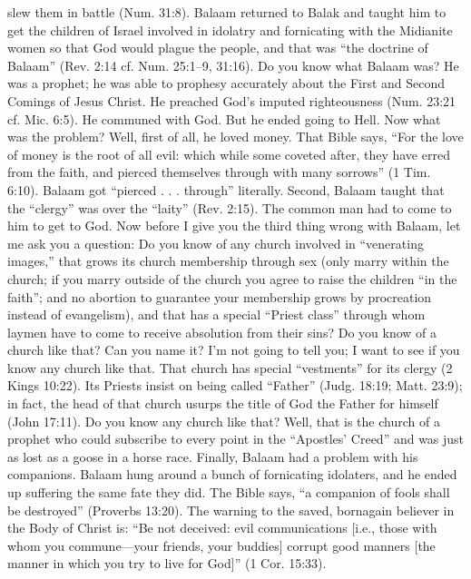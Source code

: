 {slew them in battle (Num. 31:8). Balaam
returned to Balak and taught him to get the
children of Israel involved in idolatry and
fornicating with the Midianite women so that
God would plague the people, and that was
“the doctrine of Balaam” (Rev. 2:14 cf. Num.
25:1–9, 31:16).
Do you know what Balaam was? He was a
prophet; he was able to prophesy accurately
about the First and Second Comings of Jesus
Christ. He preached God’s imputed
righteousness (Num. 23:21 cf. Mic. 6:5). He
communed with God. But he ended going to
Hell.
Now what was the problem? Well, first of
all, he loved money. That Bible says, “For the
love of money is the root of all evil: which
while some coveted after, they have erred
from the faith, and pierced themselves
through with many sorrows” (1 Tim. 6:10).
Balaam got “pierced . . . through” literally.
Second, Balaam taught that the “clergy”
was over the “laity” (Rev. 2:15). The common
man had to come to him to get to God. Now
before I give you the third thing wrong with
Balaam, let me ask you a question: Do you
know of any church involved in “venerating
images,” that grows its church membership
through sex (only marry within the church; if
you marry outside of the church you agree to
raise the children “in the faith”; and no abortion
to guarantee your membership grows by
procreation instead of evangelism), and that has
a special “Priest class” through whom laymen
have to come to receive absolution from their
sins? Do you know of a church like that? Can
you name it? I’m not going to tell you; I want to
see if you know any church like that.
That church has special “vestments” for its
clergy (2 Kings 10:22). Its Priests insist on
being called “Father” (Judg. 18:19; Matt. 23:9);
in fact, the head of that church usurps the title
of God the Father for himself (John 17:11). Do you know any church like that? Well, that is the church of a prophet who could subscribe to every point in the ``Apostles' Creed'' and was just as lost as a goose in a horse race. Finally, Balaam had a problem with his companions. Balaam hung around a bunch of fornicating idolaters, and he ended up suffering the same fate they did. The Bible says, ``a companion of fools shall be destroyed'' (Proverbs 13:20). The warning to the saved, bornagain believer in the Body of Christ is: “Be not deceived: evil communications [i.e., those with whom you commune—your friends, your buddies] corrupt good manners [the manner in which you try to live for God]” (1 Cor. 15:33).}
